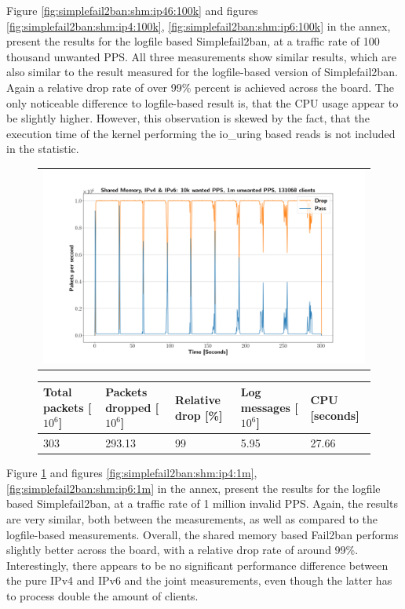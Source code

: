 Figure \ref{fig:simplefail2ban:shm:ip46:100k} and figures \ref{fig:simplefail2ban:shm:ip4:100k}, \ref{fig:simplefail2ban:shm:ip6:100k} in the annex, present the results
for the logfile based Simplefail2ban, at a traffic rate of 100 thousand unwanted \ac{PPS}. All three measurements show similar results, which are also similar to the result measured for the logfile-based
version of Simplefail2ban. Again a relative drop rate of over 99\% percent is achieved across the board. The only noticeable difference to logfile-based result is, that the \ac{CPU} usage appear to be slightly higher.
However, this observation is skewed by the fact, that the execution time of the kernel performing the io\_uring based reads is not included in the statistic. 

\pagebreak

\begin{figure}[!h]
	\centering
	\scriptsize
	\begin{tabular}{c}
    	\centerline{\includegraphics[width=1.2\textwidth]{images/simplefail2ban_shm_ipv46_v10k_iv1m_c131068.png}}
	\end{tabular}
	\begin{tabular}{lllll}
		\toprule
		\textbf{Total packets [$10^6$]} & \textbf{Packets dropped [$10^6$]} & \textbf{Relative drop [\%]} & \textbf{Log messages [$10^6$]} & \textbf{CPU [seconds]} \\ \midrule 
		303 & 293.13 & 99 & 5.95 & 27.66 \\
		\bottomrule
	\end{tabular}
	\caption[Simplefail2ban, Shared Memory, IPv4 \& IPv6, 1m \ac{PPS}]{}
	\label{fig:simplefail2ban:shm:ip46:1m}
\end{figure}

Figure \ref{fig:simplefail2ban:shm:ip46:1m} and figures \ref{fig:simplefail2ban:shm:ip4:1m}, \ref{fig:simplefail2ban:shm:ip6:1m} in the annex, present the results
for the logfile based Simplefail2ban, at a traffic rate of 1 million invalid \ac{PPS}. Again, the results are very similar, both between the measurements, as well as compared to the logfile-based
measurements. Overall, the shared memory based Fail2ban performs slightly better across the board, with a relative drop rate of around 99\%. Interestingly, there appears 
to be no significant performance difference between the pure \ac{IPv4} and \ac{IPv6} and the joint measurements, even though
the latter has to process double the amount of clients.

